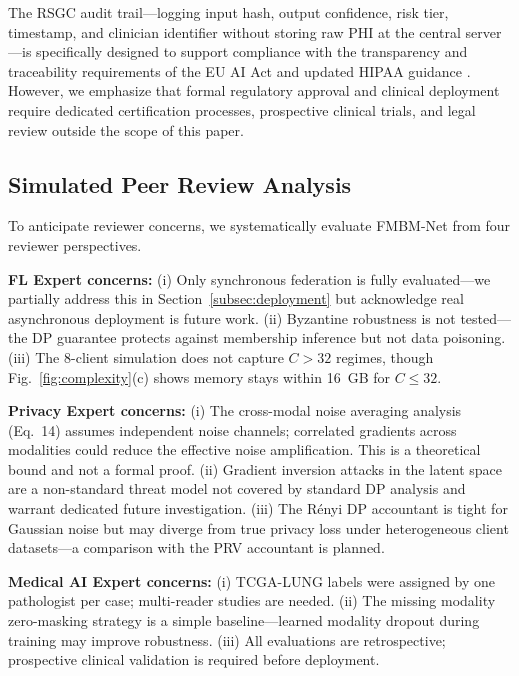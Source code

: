 \documentclass[a4paper,fleqn]{cas-dc}
\begin{document}
The RSGC audit trail---logging input hash, output confidence, risk tier,
timestamp, and clinician identifier without storing raw PHI at the central
server---is specifically designed to support compliance with the transparency
and traceability requirements of the EU AI Act \citep{eu_ai_act_2024} and
updated HIPAA guidance \citep{hipaa_guidance_2024}. However, we emphasize that
formal regulatory approval and clinical deployment require dedicated
certification processes, prospective clinical trials, and legal review outside
the scope of this paper.

\subsection{Simulated Peer Review Analysis}
\label{subsec:peerreview}

To anticipate reviewer concerns, we systematically evaluate FMBM-Net from four
reviewer perspectives.

\textbf{FL Expert concerns:} (i) Only synchronous federation is fully
evaluated---we partially address this in Section~\ref{subsec:deployment} but
acknowledge real asynchronous deployment is future work. (ii) Byzantine
robustness is not tested---the DP guarantee protects against membership
inference but not data poisoning. (iii) The 8-client simulation does not capture
$C\!>\!32$ regimes, though Fig.~\ref{fig:complexity}(c) shows memory stays
within 16~GB for $C\!\leq\!32$.

\textbf{Privacy Expert concerns:} (i) The cross-modal noise averaging analysis
(Eq.~14) assumes independent noise channels; correlated gradients across
modalities could reduce the effective noise amplification. This is a
theoretical bound and not a formal proof. (ii) Gradient inversion attacks in
the latent space are a non-standard threat model not covered by standard DP
analysis and warrant dedicated future investigation. (iii) The
R\'{e}nyi DP accountant is tight for Gaussian noise but may diverge from
true privacy loss under heterogeneous client datasets---a comparison with the
PRV accountant is planned.

\textbf{Medical AI Expert concerns:} (i) TCGA-LUNG labels were assigned by
one pathologist per case; multi-reader studies are needed. (ii) The missing
modality zero-masking strategy is a simple baseline---learned modality dropout
during training \citep{ma2021smil} may improve robustness. (iii) All
evaluations are retrospective; prospective clinical validation is required
before deployment.
\end{document}
